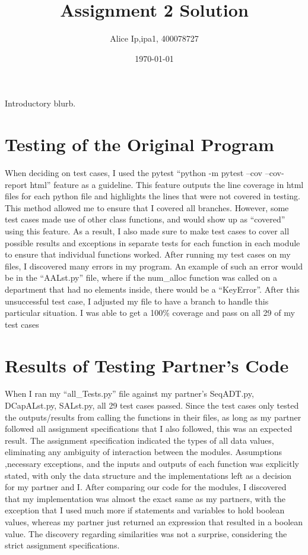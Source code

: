 \documentclass[12pt]{article}
\title{Assignment 2 Solution}
\author{Alice Ip,ipa1, 400078727}
\date{\today}
\begin{document}
\maketitle

Introductory blurb.

\section{Testing of the Original Program}

When deciding on test cases, I used the pytest ``python -m pytest --cov --cov-report html'' feature as a guideline. This feature outputs the line coverage in html files for each python file and highlights the lines that were not covered in testing. This method allowed me to ensure that I covered all branches. However, some test cases made use of other class functions, and would show up as ``covered'' using this feature. As a result, I also made sure to make test cases to cover all possible results and exceptions in separate tests for each function in each module to ensure that individual functions worked. After running my test cases on my files, I discovered many errors in my program. An example of  such an error would be in the ``AALst.py'' file, where if the num\_alloc function was called on a department that had no elements inside, there would be a ``KeyError''. After this unsuccessful test case, I adjusted my file to have a branch to handle this particular situation. I was able to get a 100\% coverage  and pass on all 29 of my test cases


\section{Results of Testing Partner's Code}

When I ran my ``all\_Tests.py'' file against my partner's SeqADT.py, DCapALst.py, SALst.py, all 29 test cases passed. Since the test cases only tested the outputs/results from calling the functions in their files, as long as my partner followed all assignment specifications that I also followed, this was an expected result. The assignment specification indicated the types of all data values, eliminating any ambiguity of interaction between the modules. Assumptions ,necessary exceptions, and the inputs and outputs of each function was explicitly stated, with only the data structure and the implementations left as a decision for my partner and I. After comparing our code for the modules, I discovered that my implementation was almost the exact same as my partners, with the exception that I used much more if statements and variables to hold boolean values, whereas my partner just returned an expression that resulted in a boolean value. The discovery regarding similarities was not a surprise, considering the strict assignment specifications.
\end{document}
